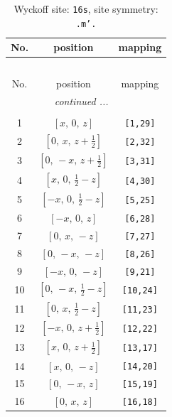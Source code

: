 \documentclass[fleqn,8pt]{jsarticle}
\begin{document}
\renewcommand{\arraystretch}{1.2}
\begin{longtable}{ccc}
\caption{Wyckoff site: {\tt 16s}, site symmetry: {\tt .m'.}}
 \\
 \hline \hline
No. & position & mapping \\ \hline \endfirsthead

\multicolumn{2}{l}{\tablename\ \thetable{}} \\
 \hline \hline
No. & position & mapping \\ \hline \endhead

 \hline \hline
\multicolumn{2}{r}{\footnotesize\it continued ...} \\ \endfoot

 \hline \hline
\multicolumn{2}{r}{} \\ \endlastfoot

1 & $\left[ x,\, 0,\, z \right]$ & {\tt [1,29]} \\ \hline
2 & $\left[ 0,\, x,\, z + \frac{1}{2} \right]$ & {\tt [2,32]} \\ \hline
3 & $\left[ 0,\, - x,\, z + \frac{1}{2} \right]$ & {\tt [3,31]} \\ \hline
4 & $\left[ x,\, 0,\, \frac{1}{2} - z \right]$ & {\tt [4,30]} \\ \hline
5 & $\left[ - x,\, 0,\, \frac{1}{2} - z \right]$ & {\tt [5,25]} \\ \hline
6 & $\left[ - x,\, 0,\, z \right]$ & {\tt [6,28]} \\ \hline
7 & $\left[ 0,\, x,\, - z \right]$ & {\tt [7,27]} \\ \hline
8 & $\left[ 0,\, - x,\, - z \right]$ & {\tt [8,26]} \\ \hline
9 & $\left[ - x,\, 0,\, - z \right]$ & {\tt [9,21]} \\ \hline
10 & $\left[ 0,\, - x,\, \frac{1}{2} - z \right]$ & {\tt [10,24]} \\ \hline
11 & $\left[ 0,\, x,\, \frac{1}{2} - z \right]$ & {\tt [11,23]} \\ \hline
12 & $\left[ - x,\, 0,\, z + \frac{1}{2} \right]$ & {\tt [12,22]} \\ \hline
13 & $\left[ x,\, 0,\, z + \frac{1}{2} \right]$ & {\tt [13,17]} \\ \hline
14 & $\left[ x,\, 0,\, - z \right]$ & {\tt [14,20]} \\ \hline
15 & $\left[ 0,\, - x,\, z \right]$ & {\tt [15,19]} \\ \hline
16 & $\left[ 0,\, x,\, z \right]$ & {\tt [16,18]} \\
\end{longtable}
\end{document}
